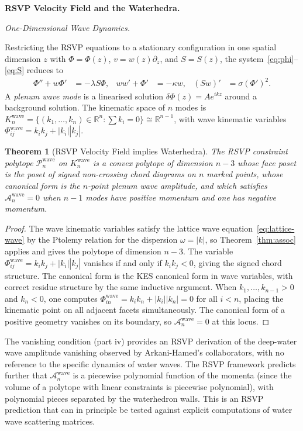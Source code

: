 \documentclass[11pt]{article}
\theoremstyle{plain}
\newtheorem{theorem}{Theorem}[section]
\theoremstyle{definition}
\theoremstyle{remark}
\newcommand{\R}{\mathbb{R}}
\newcommand{\Phif}{\Phi}
\newcommand{\vf}{v}
\newcommand{\Sf}{S}
\newcommand{\Amp}{\mathcal{A}}
\begin{document}
\bigskip\noindent\textbf{RSVP Velocity Field and the Waterhedra.}
\label{sec:water}

\medskip\noindent\textit{One-Dimensional Wave Dynamics.}

Restricting the RSVP equations to a stationary configuration in one spatial dimension $z$ with $\Phif = \Phif(z)$, $\vf = w(z)\partial_z$, and $\Sf = \Sf(z)$, the system~\eqref{eq:phi}--\eqref{eq:S} reduces to
\begin{align*}
  \Phif'' + w\Phif' &= -\lambda \Sf\Phif, &
  ww' + \Phif' &= -\kappa w, &
  (\Sf w)' &= \sigma(\Phif')^2.
\end{align*}
A \emph{plenum wave mode} is a linearised solution $\delta\Phif(z) = A e^{ikz}$ around a background solution. The kinematic space of $n$ modes is $K_n^{\mathrm{wave}} = \{(k_1,\ldots,k_n) \in \R^n : \sum k_i = 0\} \cong \R^{n-1}$, with wave kinematic variables $\Phif_{ij}^{\mathrm{wave}} = k_ik_j + |k_i||k_j|$.

\begin{theorem}[RSVP Velocity Field implies Waterhedra]
\label{thm:water}
The RSVP constraint polytope $\mathcal{P}_n^{\mathrm{wave}}$ on $K_n^{\mathrm{wave}}$ is a convex polytope of dimension $n-3$ whose face poset is the poset of signed non-crossing chord diagrams on $n$ marked points, whose canonical form is the $n$-point plenum wave amplitude, and which satisfies $\Amp_n^{\mathrm{wave}} = 0$ when $n-1$ modes have positive momentum and one has negative momentum.
\end{theorem}

\begin{proof}
The wave kinematic variables satisfy the lattice wave equation~\eqref{eq:lattice-wave} by the Ptolemy relation for the dispersion $\omega = |k|$, so Theorem~\ref{thm:assoc} applies and gives the polytope of dimension $n-3$. The variable $\Phif_{ij}^{\mathrm{wave}} = k_ik_j + |k_i||k_j|$ vanishes if and only if $k_ik_j < 0$, giving the signed chord structure. The canonical form is the KES canonical form in wave variables, with correct residue structure by the same inductive argument. When $k_1,\ldots,k_{n-1} > 0$ and $k_n < 0$, one computes $\Phif_{in}^{\mathrm{wave}} = k_i k_n + |k_i||k_n| = 0$ for all $i < n$, placing the kinematic point on all adjacent facets simultaneously. The canonical form of a positive geometry vanishes on its boundary, so $\Amp_n^{\mathrm{wave}} = 0$ at this locus.
\end{proof}

The vanishing condition (part iv) provides an RSVP derivation of the deep-water wave amplitude vanishing observed by Arkani-Hamed's collaborators, with no reference to the specific dynamics of water waves. The RSVP framework predicts further that $\Amp_n^{\mathrm{wave}}$ is a piecewise polynomial function of the momenta (since the volume of a polytope with linear constraints is piecewise polynomial), with polynomial pieces separated by the waterhedron walls. This is an RSVP prediction that can in principle be tested against explicit computations of water wave scattering matrices.
\end{document}
